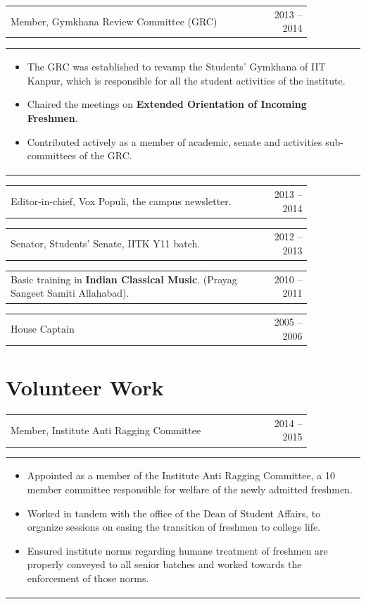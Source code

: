 \documentclass[a4paper,10pt]{article} %
\newcommand{\iproject}[3]{
    \begin{tabular}{p{0.85\linewidth}r}
        \textcolor{NavyBlue}{#2} & \multicolumn{1}{m{3cm}}{\raggedleft \textsc{#1}}\\
    \end{tabular}
    \begin{tabular}{p{\linewidth}}
    \vspace{-0.3cm}
        \footnotesize{#3}
    \end{tabular}
    \vspace{-0.5cm}
}
\newcommand{\skill}[2]{
    \begin{tabular}{p{0.85\linewidth}r}
        #2 & \multicolumn{1}{m{3cm}}{\raggedleft \textsc{#1}}\\
    \end{tabular}
    \vspace{-0.5cm}
}
\begin{document}
\iproject {2013 -- 2014}
          {Member, Gymkhana Review Committee (GRC)}
          {
               \begin{itemize}[leftmargin=0.5cm]
                   \item The GRC was established to revamp the Students' Gymkhana of IIT Kanpur,
                       which is responsible for all the student activities of the institute.
                   \item Chaired the meetings on \textbf{Extended Orientation of Incoming Freshmen}.
                   \item Contributed actively as a member of academic, senate and activities sub-committees of the GRC.
               \end{itemize}
          }

\skill {2013 -- 2014}
       {Editor-in-chief, Vox Populi, the campus newsletter.}

\skill {2012 -- 2013}
       {Senator, Students' Senate, IITK Y11 batch.}

\skill {2010 -- 2011}
       {Basic training in \textbf{Indian Classical Music}. (Prayag Sangeet Samiti Allahabad).}

\skill {2005 -- 2006}
       {House Captain}


\section{Volunteer Work}

\iproject {2014 -- 2015}
          {Member, Institute Anti Ragging Committee}
          {
               \begin{itemize}[leftmargin=0.5cm]
                   \item Appointed as a member of the Institute Anti Ragging Committee, a 10 member committee responsible
                       for welfare of the newly admitted freshmen.
                   \item Worked in tandem with the office of the Dean of Student Affairs, to organize sessions
                       on easing the transition of freshmen to college life.
                   \item Ensured institute norms regarding humane treatment of freshmen are properly conveyed to all senior batches
                       and worked towards the enforcement of those norms.
               \end{itemize}
          }
\end{document}
